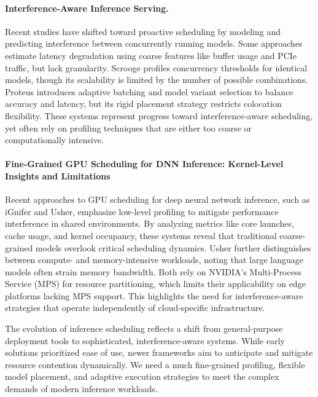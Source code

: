 \paragraph{Interference-Aware Inference Serving.}
Recent studies have shifted toward proactive scheduling by modeling and predicting interference between concurrently running models. Some approaches estimate latency degradation using coarse features like buffer usage and PCIe traffic, but lack granularity. Scrooge profiles concurrency thresholds for identical models, though its scalability is limited by the number of possible combinations. Proteus introduces adaptive batching and model variant selection to balance accuracy and latency, but its rigid placement strategy restricts colocation flexibility. These systems represent progress toward interference-aware scheduling, yet often rely on profiling techniques that are either too coarse or computationally intensive.

\paragraph{Fine-Grained GPU Scheduling for DNN Inference: Kernel-Level Insights and Limitations}
Recent approaches to GPU scheduling for deep neural network inference, such as iGnifer and Usher, emphasize low-level profiling to mitigate performance interference in shared environments. By analyzing metrics like core launches, cache usage, and kernel occupancy, these systems reveal that traditional coarse-grained models overlook critical scheduling dynamics. Usher further distinguishes between compute- and memory-intensive workloads, noting that large language models often strain memory bandwidth. Both rely on NVIDIA's Multi-Process Service (MPS) for resource partitioning, which limits their applicability on edge platforms lacking MPS support. This highlights the need for interference-aware strategies that operate independently of cloud-specific infrastructure.

The evolution of inference scheduling reflects a shift from general-purpose deployment tools to sophisticated, interference-aware systems. While early solutions prioritized ease of use, newer frameworks aim to anticipate and mitigate resource contention dynamically. We need a much fine-grained profiling, flexible model placement, and adaptive execution strategies to meet the complex demands of modern inference workloads.
